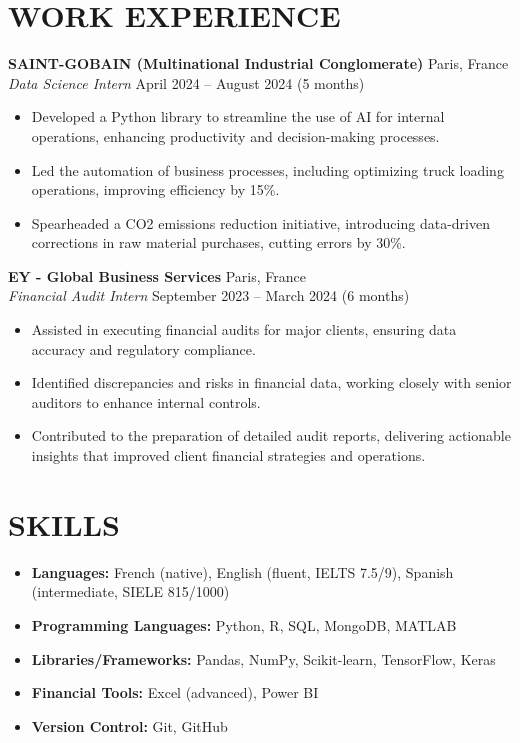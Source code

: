 \documentclass[a4paper,9pt]{extarticle}
\begin{document}
\section*{WORK EXPERIENCE}
\textbf{SAINT-GOBAIN (Multinational Industrial Conglomerate)} \hfill Paris, France\\
\textit{Data Science Intern} \hfill April 2024 -- August 2024 (5 months)\\
\begin{itemize}
    \item Developed a Python library to streamline the use of AI for internal operations, enhancing productivity and decision-making processes.
    \item Led the automation of business processes, including optimizing truck loading operations, improving efficiency by 15\%.
    \item Spearheaded a CO2 emissions reduction initiative, introducing data-driven corrections in raw material purchases, cutting errors by 30\%.
\end{itemize}

\vspace{12pt} %
\noindent
\textbf{EY - Global Business Services} \hfill Paris, France\\
\textit{Financial Audit Intern} \hfill September 2023 -- March 2024 (6 months)\\
\begin{itemize}
    \item Assisted in executing financial audits for major clients, ensuring data accuracy and regulatory compliance.
    \item Identified discrepancies and risks in financial data, working closely with senior auditors to enhance internal controls.
    \item Contributed to the preparation of detailed audit reports, delivering actionable insights that improved client financial strategies and operations.
\end{itemize}

\section*{SKILLS}
\vspace{-10pt} %
\begin{multicols}{2}
\begin{itemize}
    \item \textbf{Languages:} French (native), English (fluent, IELTS 7.5/9), Spanish (intermediate, SIELE 815/1000)
    \item \textbf{Programming Languages:} Python, R, SQL, MongoDB, MATLAB
    \item \textbf{Libraries/Frameworks:} Pandas, NumPy, Scikit-learn, TensorFlow, Keras
    \item \textbf{Financial Tools:} Excel (advanced), Power BI
    \item \textbf{Version Control:} Git, GitHub
\end{itemize}
\end{multicols}
\end{document}
